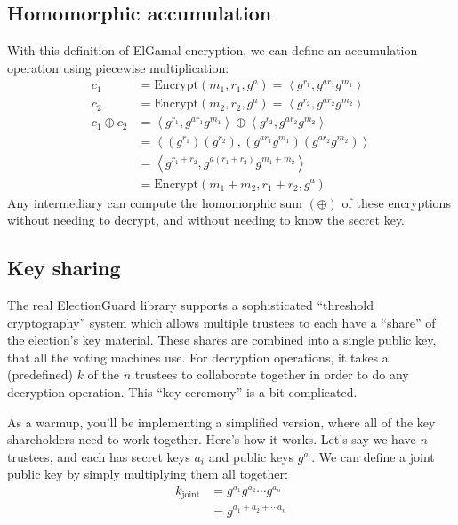 \subsection{Homomorphic accumulation}
With this definition of ElGamal encryption, we can define an
accumulation operation using piecewise multiplication:
\begin{align*}
c_1 &= \mathrm{Encrypt}(m_1, r_1, g^a) = \left<g^{r_1}, g^{a{r_1}}g^{m_1}\right>\\
c_2 &= \mathrm{Encrypt}(m_2, r_2, g^a) = \left<g^{r_2}, g^{a{r_2}}g^{m_2}\right>\\
c_1 \oplus c_2 &= \left<g^{r_1}, g^{a{r_1}}g^{m_1}\right> \oplus \left<g^{r_2}, g^{a{r_2}}g^{m_2}\right>  \\
&= \left<\left(g^{r_1}\right)\left(g^{r_2}\right), \left(g^{a{r_1}}g^{m_1}\right)\left(g^{a{r_2}}g^{m_2}\right)\right> \\
&= \left<g^{r_1 + r_2}, g^{a(r_1 + r_2)}g^{m_1 + m_2}\right>\\
&= \mathrm{Encrypt}(m_1 + m_2, r_1 + r_2, g^a)
\end{align*}
Any intermediary can compute the homomorphic sum $(\oplus)$ of these encryptions
without needing to decrypt, and without needing to know the secret
key.

\subsection{Key sharing}
\label{sec:keyshare}

The real ElectionGuard library supports a sophisticated ``threshold
cryptography'' system
which allows multiple trustees to each have a ``share'' of the
election's key material. These shares are combined into a single
public key, that all the voting machines use. For decryption
operations, it takes a (predefined) $k$ of the $n$ trustees to
collaborate together in order to do any decryption operation.
This ``key ceremony'' is a bit complicated.

As a warmup, you'll be implementing a simplified version, where
all of the key shareholders need to work together. Here's how it
works. Let's say we have $n$ trustees, and each has secret keys $a_i$
and public keys $g^{a_i}$. We can define a joint public key by
simply multiplying them all together:
\begin{align*}
k_{\mathrm{joint}}&= g^{a_1}g^{a_2} \cdots g^{a_n}\\
&= g^{a_1 + a_2 + \cdots a_n}
\end{align*}
                                                                 
